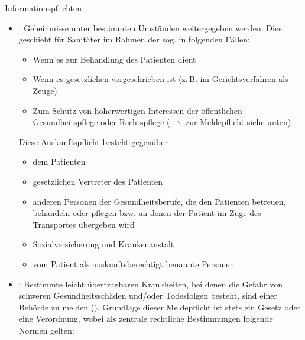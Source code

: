 {Informationspflichten}
{%

\begin{itemize}
  \item {}: \label{topic:auskunftspflicht}
  Geheimnisse 
  unter bestimmten Umständen weitergegeben werden. Dies
  geschieht für Sanitäter im Rahmen der sog.
   in folgenden
  Fällen:
  \begin{itemize}
    \item   Wenn es zur Behandlung des Patienten dient
    \item   Wenn es gesetzlichen vorgeschrieben ist (z.\,B. im
    Gerichtsverfahren als Zeuge)
    \item Zum Schutz von höherwertigen Interessen der
    öffentlichen Gesundheitspflege oder Rechtspflege
    (${\rightarrow}$ zur Meldepflicht
    siehe unten)
  \end{itemize}
  Diese Auskunftspflicht besteht gegenüber
  \begin{itemize}
    \item   dem Patienten
    \item   gesetzlichen Vertreter des Patienten
    \item   anderen Personen der Gesundheitsberufe, die den
    Patienten betreuen, behandeln oder pflegen bzw. an denen
    der Patient im Zuge des Transportes übergeben wird \item
    Sozialversicherung und Krankenanstalt \item vom Patient als
    auskunftsberechtigt benannte Personen
  \end{itemize}
  \item {}: Bestimmte leicht
  übertragbaren Krankheiten, bei denen die Gefahr von
  schweren Gesundheitsschäden und/oder Todesfolgen besteht,
  sind einer Behörde zu melden (). Grundlage dieser Meldepflicht ist stets ein
  Gesetz oder eine Verordnung, wobei als zentrale rechtliche
  Bestimmungen folgende Normen gelten:
\end{itemize}}
